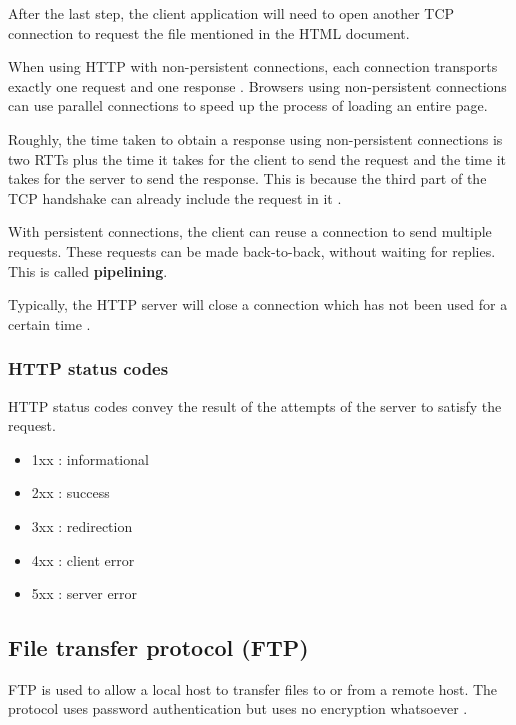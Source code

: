 After the last step, the client application will need to open another TCP connection to request the file mentioned in the HTML document.

When using HTTP with non-persistent connections, each connection transports exactly one request and one response \cite[p.~101]{computer-networking-kurose-2012}.
Browsers using non-persistent connections can use parallel connections to speed up the process of loading an entire page.

Roughly, the time taken to obtain a response using non-persistent connections is two RTTs plus the time it takes for the client to send the request and the time it takes for the server to send the response.
This is because the third part of the TCP handshake can already include the request in it \cite[p.~102]{computer-networking-kurose-2012}.

With persistent connections, the client can reuse a connection to send multiple requests. These requests can be made back-to-back, without waiting for replies.
This is called \textbf{pipelining}.

Typically, the HTTP server will close a connection which has not been used for a certain time \cite[p.~103]{computer-networking-kurose-2012}.

\subsubsection{HTTP status codes}

HTTP status codes convey the result of the attempts of the server to satisfy the request.

\begin{itemize}
 \item 1xx : informational
 \item 2xx : success
 \item 3xx : redirection
 \item 4xx : client error
 \item 5xx : server error
\end{itemize}

\subsection{File transfer protocol (FTP)}

FTP is used to allow a local host to transfer files to or from a remote host. The protocol uses password authentication but uses no encryption whatsoever \cite[p.~116]{computer-networking-kurose-2012}.

